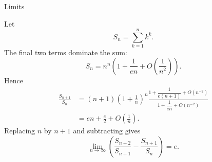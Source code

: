 \begin{expectedproblemgroup}{Limits}
        \begin{expectedsubsolution}
            Let
            \[
                S_n=\sum_{k=1}^{n}k^k.
            \]
            The final two terms dominate the sum:
            \[
                S_n
                =
                n^n\left(1+\frac{1}{en}+O\left(\frac{1}{n^2}\right)\right).
            \]
            Hence
            \[
                \begin{aligned}
                    \frac{S_{n+1}}{S_n}
                    &=
                    (n+1)\left(1+\frac{1}{n}\right)^n
                    \frac{
                        1+\dfrac{1}{e(n+1)}+O(n^{-2})
                    }{
                        1+\dfrac{1}{en}+O(n^{-2})
                    }\\
                    &=
                    en+\frac{e}{2}+O\left(\frac{1}{n}\right).
                \end{aligned}
            \]
            Replacing $n$ by $n+1$ and subtracting gives
            \[
                \boxed{
                    \lim\limits_{n\to\infty}
                    \left(
                        \frac{S_{n+2}}{S_{n+1}}
                        -
                        \frac{S_{n+1}}{S_n}
                    \right)
                    =e
                }.
            \]
        \end{expectedsubsolution}

    \end{expectedproblemgroup}

